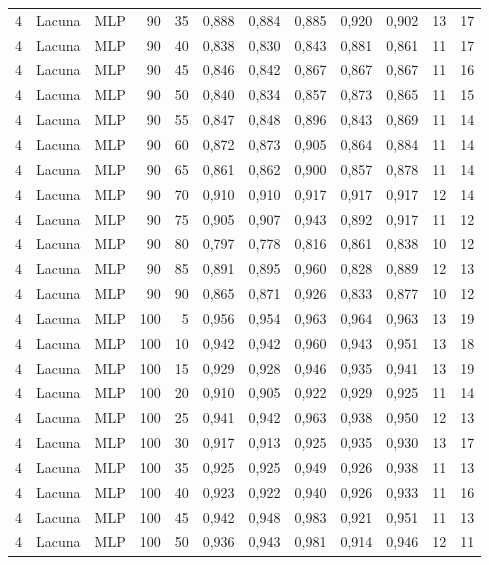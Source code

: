 \begin{longtable}{@{}rllrrrrrrrrr@{}}
4 & Lacuna & MLP & 90 & 35 & 0,888 & 0,884 & 0,885 & 0,920 & 0,902 & 13 & 17 \\
4 & Lacuna & MLP & 90 & 40 & 0,838 & 0,830 & 0,843 & 0,881 & 0,861 & 11 & 17 \\
4 & Lacuna & MLP & 90 & 45 & 0,846 & 0,842 & 0,867 & 0,867 & 0,867 & 11 & 16 \\
4 & Lacuna & MLP & 90 & 50 & 0,840 & 0,834 & 0,857 & 0,873 & 0,865 & 11 & 15 \\
4 & Lacuna & MLP & 90 & 55 & 0,847 & 0,848 & 0,896 & 0,843 & 0,869 & 11 & 14 \\
4 & Lacuna & MLP & 90 & 60 & 0,872 & 0,873 & 0,905 & 0,864 & 0,884 & 11 & 14 \\
4 & Lacuna & MLP & 90 & 65 & 0,861 & 0,862 & 0,900 & 0,857 & 0,878 & 11 & 14 \\
4 & Lacuna & MLP & 90 & 70 & 0,910 & 0,910 & 0,917 & 0,917 & 0,917 & 12 & 14 \\
4 & Lacuna & MLP & 90 & 75 & 0,905 & 0,907 & 0,943 & 0,892 & 0,917 & 11 & 12 \\
4 & Lacuna & MLP & 90 & 80 & 0,797 & 0,778 & 0,816 & 0,861 & 0,838 & 10 & 12 \\
4 & Lacuna & MLP & 90 & 85 & 0,891 & 0,895 & 0,960 & 0,828 & 0,889 & 12 & 13 \\
4 & Lacuna & MLP & 90 & 90 & 0,865 & 0,871 & 0,926 & 0,833 & 0,877 & 10 & 12 \\
4 & Lacuna & MLP & 100 & 5 & 0,956 & 0,954 & 0,963 & 0,964 & 0,963 & 13 & 19 \\
4 & Lacuna & MLP & 100 & 10 & 0,942 & 0,942 & 0,960 & 0,943 & 0,951 & 13 & 18 \\
4 & Lacuna & MLP & 100 & 15 & 0,929 & 0,928 & 0,946 & 0,935 & 0,941 & 13 & 19 \\
4 & Lacuna & MLP & 100 & 20 & 0,910 & 0,905 & 0,922 & 0,929 & 0,925 & 11 & 14 \\
4 & Lacuna & MLP & 100 & 25 & 0,941 & 0,942 & 0,963 & 0,938 & 0,950 & 12 & 13 \\
4 & Lacuna & MLP & 100 & 30 & 0,917 & 0,913 & 0,925 & 0,935 & 0,930 & 13 & 17 \\
4 & Lacuna & MLP & 100 & 35 & 0,925 & 0,925 & 0,949 & 0,926 & 0,938 & 11 & 13 \\
4 & Lacuna & MLP & 100 & 40 & 0,923 & 0,922 & 0,940 & 0,926 & 0,933 & 11 & 16 \\
4 & Lacuna & MLP & 100 & 45 & 0,942 & 0,948 & 0,983 & 0,921 & 0,951 & 11 & 13 \\
4 & Lacuna & MLP & 100 & 50 & 0,936 & 0,943 & 0,981 & 0,914 & 0,946 & 12 & 11 \\

\end{longtable}
